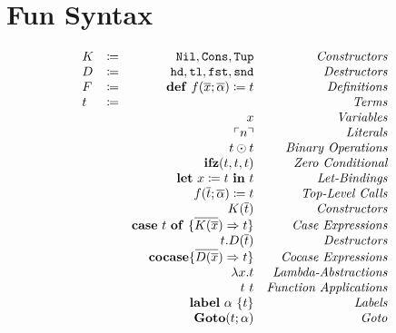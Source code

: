\documentclass{article}
\newcommand{\lit}[1]{\ensuremath{\ulcorner #1\urcorner}}
\newcommand{\letin}[3]{\ensuremath{\mathbf{let}\ #1 \coloneq #2\ \mathbf{in}\ #3}}
\newcommand{\caseof}[2]{\ensuremath{\mathbf{case}\ #1\ \mathbf{of}\ \{ #2 \}}}
\begin{document}
\section{Fun Syntax}

\[ 
\begin{array}{l c r r} 
  K & \coloneqq & \mathtt{Nil}, \mathtt{Cons}, \mathtt{Tup} & \emph{Constructors}\\
  D & \coloneqq & \mathtt{hd}, \mathtt{tl}, \mathtt{fst}, \mathtt{snd} & \emph{Destructors}\\
  F & \coloneqq & \mathbf{def}\ f(\overline{x};\overline{\alpha}) \coloneq t & \emph{Definitions}\\
  t & \coloneqq & & \emph{Terms}\\
  && x & \emph{Variables}\\
  && \lit{n}  & \emph{Literals}\\
  && t \odot t & \emph{Binary Operations}\\
  && \mathbf{ifz}(t,t,t) & \emph{Zero Conditional}\\
  && \letin{x}{t}{t} & \emph{Let-Bindings}\\
  && f(\overline{t};\overline{\alpha}) \coloneq t & \emph{Top-Level Calls}\\
  && K(\overline{t}) & \emph{Constructors}\\
  && \caseof{t}{\overline{K(\overline{x}}) \Rightarrow t} & \emph{Case Expressions}\\
  && t.D(\overline{t}) & \emph{Destructors}\\
  && \mathbf{cocase} \{ \overline{ D(\overline{x}}) \Rightarrow t \} & \emph{Cocase Expressions}\\
  && \lambda x.t & \emph{Lambda-Abstractions}\\
  && t\ t & \emph{Function Applications}\\
  && \mathbf{label}\ \alpha\ \{t\} & \emph{Labels}\\
  && \mathbf{Goto}(t;\alpha) & \emph{Goto}
\end{array}
\] 
\end{document}
